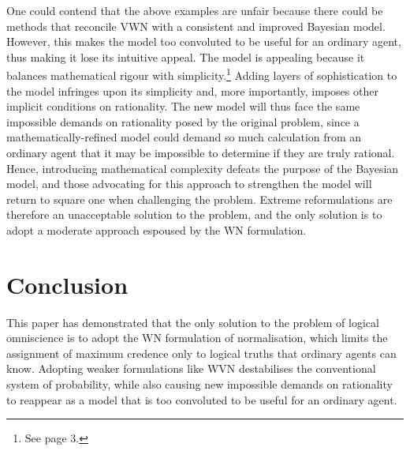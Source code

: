 \documentclass[12pt]{article}
\begin{document}
One could contend that the above examples are unfair because there could be methods that reconcile VWN with a consistent and improved Bayesian model. However, this makes the model too convoluted to be useful for an ordinary agent, thus making it lose its intuitive appeal. The model is appealing because it balances mathematical rigour with simplicity.\footnote{See page 3.} Adding layers of sophistication to the model infringes upon its simplicity and, more importantly, imposes other implicit conditions on rationality. The new model will thus face the same impossible demands on rationality posed by the original problem, since a mathematically-refined model could demand so much calculation from an ordinary agent that it may be impossible to determine if they are truly rational. Hence, introducing mathematical complexity defeats the purpose of the Bayesian model, and those advocating for this approach to strengthen the model will return to square one when challenging the problem. Extreme reformulations are therefore an unacceptable solution to the problem, and the only solution is to adopt a moderate approach espoused by the WN formulation.
\section{Conclusion}
This paper has demonstrated that the only solution to the problem of logical omniscience is to adopt the WN formulation of normalisation, which limits the assignment of maximum credence only to logical truths that ordinary agents can know. Adopting weaker formulations like WVN destabilises the conventional system of probability, while also causing new impossible demands on rationality to reappear as a model that is too convoluted to be useful for an ordinary agent.
\pagebreak
\printbibliography
\end{document}
